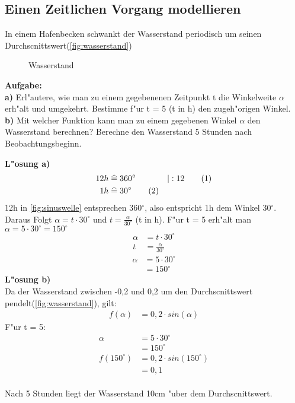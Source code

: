\documentclass{standalone}
\begin{document}
\subsection{Einen Zeitlichen Vorgang modellieren}

\noindent In einem Hafenbecken schwankt der Wasserstand periodisch um seinen Durchscnittswert(\autoref{fig:wasserstand})

\begin{figure}[hb!]
  \center
  \def\svgwidth{500px}
  
  \caption{Wasserstand}
  \label{fig:wasserstand}
\end{figure}

\noindent \textbf{Aufgabe:}\\
\noindent \textbf{a)} Erl{"a}utere, wie man zu einem gegebenenen Zeitpunkt t die Winkelweite $\alpha$ erh{"a}lt und umgekehrt. Bestimme f{"u}r t = 5 (t in h) den zugeh{"o}rigen Winkel.\\
\noindent \textbf{b)} Mit welcher Funktion kann man zu einem gegebenen Winkel $\alpha$ den Wasserstand berechnen? Berechne den Wasserstand 5 Stunden nach Beobachtungsbeginn.\\

\newpage

\noindent \textbf{L{"o}sung a)}
\begin{align}
  12h & \equalhat 360^\circ        & |:12\tag{1} \\
  1h  & \equalhat 30^\circ \tag{2}
\end{align}
\noindent 12h in {\autoref{fig:sinuswelle}} entsprechen 360$^\circ$, also entspricht 1h dem Winkel 30$^\circ$.\\
Daraus Folgt $\alpha = t \cdot 30^\circ$ und $t = \frac{\alpha}{30^\circ}$ (t in h). F{"u}r t = 5 erh{"a}lt man $\alpha = 5 \cdot 30^\circ = 150^\circ$
\begin{align}
  \alpha & = t \cdot 30^\circ     \nonumber      \\
  t      & = \frac{\alpha}{30^\circ}   \nonumber
\end{align}
\begin{align}
  \alpha & = 5 \cdot 30^\circ \tag{1} \\ & = 150^\circ \tag{2}
\end{align}
\noindent \textbf{L{"o}sung b)}\\
Da der Wasserstand zwischen -0,2 und 0,2 um den Durchscnittswert pendelt(\autoref{fig:wasserstand}), gilt:
\begin{align}
  f(\alpha) & = 0,2 \cdot sin(\alpha)     \nonumber
\end{align}
\noindent F{"u}r t = 5:
\begin{align}
  \alpha       & = 5 \cdot 30^\circ     \tag{1}     \\
               & = 150^\circ   \tag{2}              \\
  f(150^\circ) & = 0,2 \cdot sin(150^\circ) \tag{3} \\
               & = 0,1 \tag{4}
\end{align}\\
\noindent Nach 5 Stunden liegt der Wasserstand 10cm {"u}ber dem Durchscnittswert.
\end{document}
